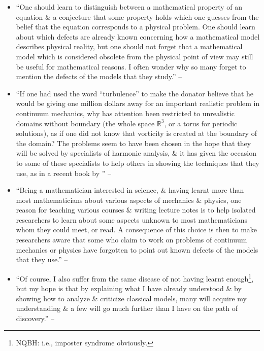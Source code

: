 \documentclass{article}
\begin{document}
\begin{enumerate}
\begin{itemize}
		\item ``One should learn to distinguish between a mathematical property of an equation \& a conjecture that some property holds which one guesses from the belief that the equation corresponds to a physical problem. One should learn about which defects are already known concerning how a mathematical model describes physical reality, but one should not forget that a mathematical model which is considered obsolete from the physical point of view may still be useful for mathematical reasons. I often wonder why so many forget to mention the defects of the models that they study.'' -- \cite[Preface, p. vii]{Tartar2006}		
		\item ``If one had used the word ``turbulence'' to make the donator believe that he would be giving one million dollars away for an important realistic problem in continuum mechanics, why has attention been restricted to unrealistic domains without boundary (the whole space $\mathbb{R}^3$, or a torus for periodic solutions), as if one did not know that vorticity is created at the boundary of the domain? The problems seem to have been chosen in the hope that they will be solved by specialists of harmonic analysis, \& it has given the occasion to some of these specialists to help others in showing the techniques that they use, as in a recent book by \cite{Lemarie-Rieusset2016}'' -- \cite[Preface, p. viii]{Tartar2006}		
		\item ``Being a mathematician interested in science, \& having learnt more than most mathematicians about various aspects of mechanics \& physics, one reason for teaching various courses \& writing lecture notes is to help isolated researchers to learn about some aspects unknown to most mathematicians whom they could meet, or read. A consequence of this choice is then to make researchers aware that some who claim to work on problems of continuum mechanics or physics have forgotten to point out known defects of the models that they use.'' -- \cite[Preface, pp. viii--ix]{Tartar2006}
		\item ``Of course, I also suffer from the same disease of not having learnt enough\footnote{NQBH: i.e., imposter syndrome obviously.}, but my hope is that by explaining what I have already understood \& by showing how to analyze \& criticize classical models, many will acquire my understanding \& a few will go much further than I have on the path of discovery.'' -- \cite[Preface, p. ix]{Tartar2006}

\end{itemize}
\end{enumerate}
\end{document}
